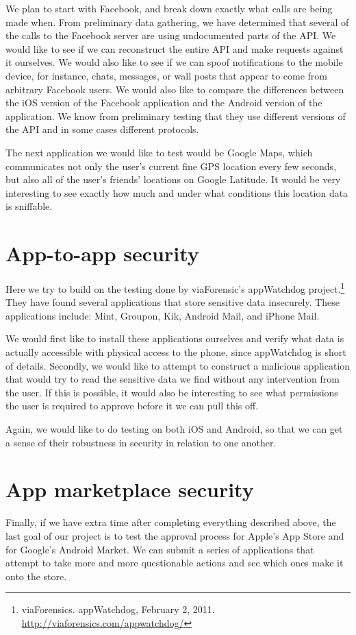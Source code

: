 \documentclass[11pt]{article}
\begin{document}
We plan to start with Facebook, and break down exactly what calls are being made when. From preliminary data gathering, we have determined that several of the calls to the Facebook server are using undocumented parts of the API. We would like to see if we can reconstruct the entire API and make requests against it ourselves. We would also like to see if we can spoof notifications to the mobile device, for instance, chats, messages, or wall posts that appear to come from arbitrary Facebook users. We would also like to compare the differences between the iOS version of the Facebook application and the Android version of the application. We know from preliminary testing that they use different versions of the API and in some cases different protocols.

The next application we would like to test would be Google Maps, which communicates not only the user's current fine GPS location every few seconds, but also all of the user's friends' locations on Google Latitude. It would be very interesting to see exactly how much and under what conditions this location data is sniffable.

\section{App-to-app security}
Here we try to build on the testing done by viaForensic's appWatchdog project.\footnote{viaForensics. appWatchdog, February 2, 2011. \url{http://viaforensics.com/appwatchdog/}} They have found several applications that store sensitive data insecurely. These applications include: Mint, Groupon, Kik, Android Mail, and iPhone Mail.

We would first like to install these applications ourselves and verify what data is actually accessible with physical access to the phone, since appWatchdog is short of details. Secondly, we would like to attempt to construct a malicious application that would try to read the sensitive data we find without any intervention from the user. If this is possible, it would also be interesting to see what permissions the user is required to approve before it we can pull this off.

Again, we would like to do testing on both iOS and Android, so that we can get a sense of their robustness in security in relation to one another.

\section{App marketplace security}
Finally, if we have extra time after completing everything described above, the last goal of our project is to test the approval process for Apple's App Store and for Google's Android Market. We can submit a series of applications that attempt to take more and more questionable actions and see which ones make it onto the store.
\end{document}
